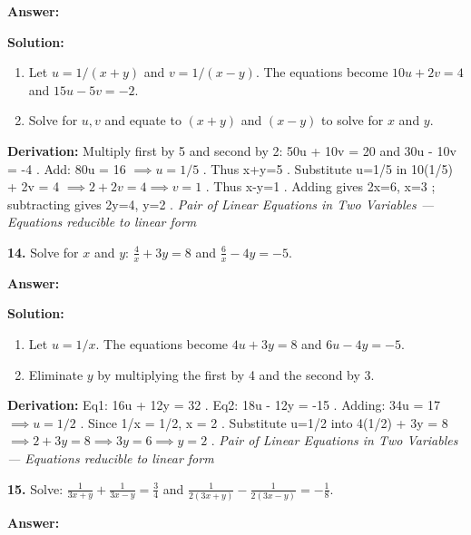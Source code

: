 \documentclass[12pt,a4paper]{exam}
\newcommand{\fitmath}[1]{%
  \sbox{\schmathbox}{$\displaystyle #1$}%
  \ifdim\wd\schmathbox>\linewidth
    \resizebox{\linewidth}{!}{\usebox{\schmathbox}}%
  \else
    \usebox{\schmathbox}%
  \fi}
\begin{document}
\begin{questions}
\textbf{Answer:}
\begin{center}
\fitmath{x = 3, y = 2}
\end{center}

\textbf{Solution:}
\begin{enumerate}
  \item Let $u = 1/(x+y)$ and $v = 1/(x-y)$. The equations become $10u + 2v = 4$ and $15u - 5v = -2$.
  \item Solve for $u, v$ and equate to $(x+y)$ and $(x-y)$ to solve for $x$ and $y$.
\end{enumerate}
\textbf{Derivation:}
Multiply first by 5 and second by 2:  50u + 10v = 20  and  30u - 10v = -4 . Add:  80u = 16 $\implies u = 1/5$ . Thus  x+y=5 . Substitute  u=1/5  in  10(1/5) + 2v = 4 $\implies 2 + 2v = 4 \implies v = 1$ . Thus  x-y=1 . Adding gives  2x=6, x=3 ; subtracting gives  2y=4, y=2 .
\hfill \textit{Pair of Linear Equations in Two Variables — Equations reducible to linear form}
\vspace{0.3cm}

\question \textbf{14.} Solve for $x$ and $y$: $\frac{4}{x} + 3y = 8$ and $\frac{6}{x} - 4y = -5$.

\textbf{Answer:}
\begin{center}
\fitmath{x = 2, y = 0}
\end{center}

\textbf{Solution:}
\begin{enumerate}
  \item Let $u = 1/x$. The equations become $4u + 3y = 8$ and $6u - 4y = -5$.
  \item Eliminate $y$ by multiplying the first by 4 and the second by 3.
\end{enumerate}
\textbf{Derivation:}
Eq1:  16u + 12y = 32 . Eq2:  18u - 12y = -15 . Adding:  34u = 17 $\implies u = 1/2$ . Since  1/x = 1/2, x = 2 . Substitute  u=1/2  into  4(1/2) + 3y = 8 $\implies 2 + 3y = 8 \implies 3y = 6 \implies y = 2$ .
\hfill \textit{Pair of Linear Equations in Two Variables — Equations reducible to linear form}
\vspace{0.3cm}

\question \textbf{15.} Solve: $\frac{1}{3x+y} + \frac{1}{3x-y} = \frac{3}{4}$ and $\frac{1}{2(3x+y)} - \frac{1}{2(3x-y)} = -\frac{1}{8}$.

\textbf{Answer:}
\begin{center}
\fitmath{x = 1, y = 1}
\end{center}


\end{questions}
\end{document}
